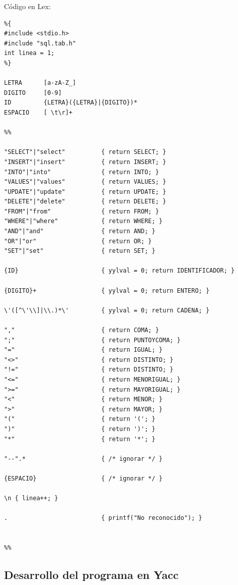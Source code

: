 \documentclass{article}
\begin{document}
Código en Lex: \\

\begin{lstlisting}[style=CStyle]
%option noyywrap
%{
#include <stdio.h>
#include "sql.tab.h"  
int linea = 1;
%}

LETRA      [a-zA-Z_]
DIGITO     [0-9]
ID         {LETRA}({LETRA}|{DIGITO})*
ESPACIO    [ \t\r]+

%%

"SELECT"|"select"          { return SELECT; }
"INSERT"|"insert"          { return INSERT; }
"INTO"|"into"              { return INTO; }
"VALUES"|"values"          { return VALUES; }
"UPDATE"|"update"          { return UPDATE; }
"DELETE"|"delete"          { return DELETE; }
"FROM"|"from"              { return FROM; }
"WHERE"|"where"            { return WHERE; }
"AND"|"and"                { return AND; }
"OR"|"or"                  { return OR; }
"SET"|"set"                { return SET; }

{ID}                       { yylval = 0; return IDENTIFICADOR; }

{DIGITO}+                  { yylval = 0; return ENTERO; }

\'([^\'\\]|\\.)*\'         { yylval = 0; return CADENA; }

","                        { return COMA; }
";"                        { return PUNTOYCOMA; }
"="                        { return IGUAL; }
"<>"                       { return DISTINTO; }
"!="                       { return DISTINTO; }
"<="                       { return MENORIGUAL; }
">="                       { return MAYORIGUAL; }
"<"                        { return MENOR; }
">"                        { return MAYOR; }
"("                        { return '('; }
")"                        { return ')'; }
"*"                        { return '*'; }

"--".*                     { /* ignorar */ }

{ESPACIO}                  { /* ignorar */ }

\n { linea++; }

.                          { printf("No reconocido"); }


%%
\end{lstlisting}

\newpage

\subsection{Desarrollo del programa en Yacc}
\end{document}
